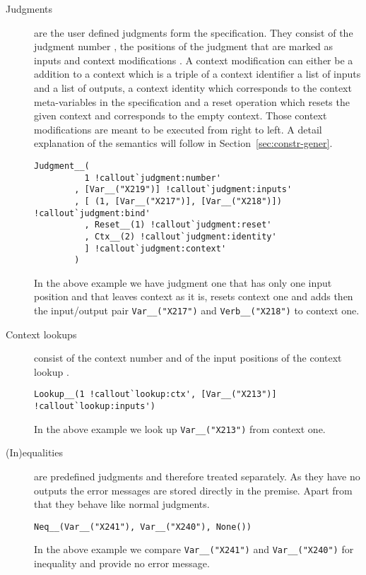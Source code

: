 \begin{description}
\item[Judgments] are the user defined judgments form the
  specification. They consist of the judgment number
  , the positions of the judgment that are
  marked as inputs  and context
  modifications . A context modification
  can either be a addition to a context 
  which is a triple of a context identifier a list of inputs and a
  list of outputs, a context identity 
  which corresponds to the context meta-variables in the specification
  and a reset operation  which resets the given context and corresponds
  to the empty context. Those context modifications are meant to be
  executed from right to left. A detail explanation of the semantics
  will follow in Section~\ref{sec:constr-gener}.

\begin{verbatim}
Judgment__(
          1 !callout`judgment:number'
        , [Var__("X219")] !callout`judgment:inputs'
        , [ (1, [Var__("X217")], [Var__("X218")]) !callout`judgment:bind'
          , Reset__(1) !callout`judgment:reset'
          , Ctx__(2) !callout`judgment:identity'
          ] !callout`judgment:context'
        )
\end{verbatim}

  In the above example we have judgment one that has only one input
  position and that leaves context as it is, resets context one and
  adds then the input/output pair \verb|Var__("X217")| and
  \verb|Verb__("X218")| to context one.

\item[Context lookups] consist of the context number
   and of the input positions of the context
  lookup .

\begin{verbatim}
Lookup__(1 !callout`lookup:ctx', [Var__("X213")] !callout`lookup:inputs')
\end{verbatim}

  In the above example we look up \verb|Var__("X213")| from context
  one.

\item[(In)equalities] are predefined judgments and therefore treated
  separately. As they have no outputs the error messages are stored
  directly in the premise. Apart from that they behave like normal
  judgments.
\begin{verbatim}
Neq__(Var__("X241"), Var__("X240"), None())
\end{verbatim}

  In the above example we compare \verb|Var__("X241")| and
  \verb|Var__("X240")| for inequality and provide no error message.
\end{description}

